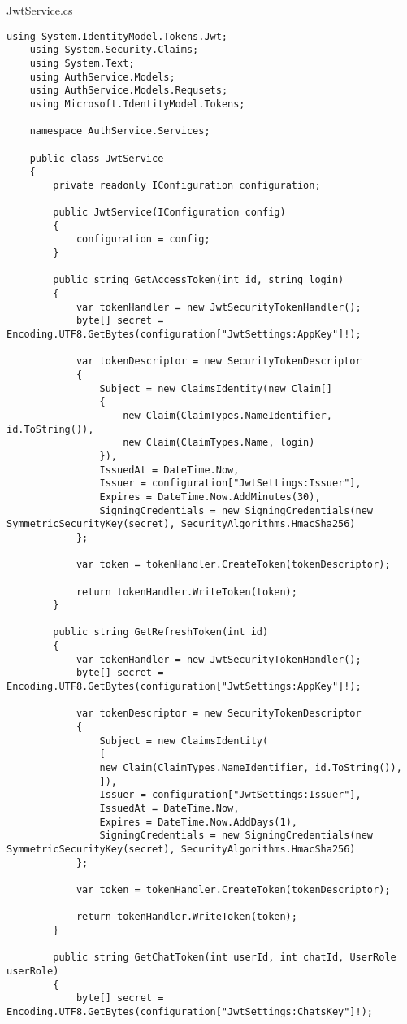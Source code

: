 JwtService.cs
\begin{lstlisting}[style=c#]
	using System.IdentityModel.Tokens.Jwt;
	using System.Security.Claims;
	using System.Text;
	using AuthService.Models;
	using AuthService.Models.Requsets;
	using Microsoft.IdentityModel.Tokens;
	
	namespace AuthService.Services;
	
	public class JwtService
	{
		private readonly IConfiguration configuration;
		
		public JwtService(IConfiguration config)
		{
			configuration = config;
		}
		
		public string GetAccessToken(int id, string login)
		{
			var tokenHandler = new JwtSecurityTokenHandler();
			byte[] secret = Encoding.UTF8.GetBytes(configuration["JwtSettings:AppKey"]!);
			
			var tokenDescriptor = new SecurityTokenDescriptor
			{
				Subject = new ClaimsIdentity(new Claim[]
				{
					new Claim(ClaimTypes.NameIdentifier, id.ToString()),
					new Claim(ClaimTypes.Name, login)
				}),
				IssuedAt = DateTime.Now,
				Issuer = configuration["JwtSettings:Issuer"],
				Expires = DateTime.Now.AddMinutes(30),
				SigningCredentials = new SigningCredentials(new SymmetricSecurityKey(secret), SecurityAlgorithms.HmacSha256)
			};
			
			var token = tokenHandler.CreateToken(tokenDescriptor);
			
			return tokenHandler.WriteToken(token);
		}
		
		public string GetRefreshToken(int id)
		{
			var tokenHandler = new JwtSecurityTokenHandler();
			byte[] secret = Encoding.UTF8.GetBytes(configuration["JwtSettings:AppKey"]!);
			
			var tokenDescriptor = new SecurityTokenDescriptor
			{
				Subject = new ClaimsIdentity(
				[
				new Claim(ClaimTypes.NameIdentifier, id.ToString()),
				]),
				Issuer = configuration["JwtSettings:Issuer"],
				IssuedAt = DateTime.Now,
				Expires = DateTime.Now.AddDays(1),
				SigningCredentials = new SigningCredentials(new SymmetricSecurityKey(secret), SecurityAlgorithms.HmacSha256)
			};
			
			var token = tokenHandler.CreateToken(tokenDescriptor);
			
			return tokenHandler.WriteToken(token);
		}
		
		public string GetChatToken(int userId, int chatId, UserRole userRole)
		{
			byte[] secret = Encoding.UTF8.GetBytes(configuration["JwtSettings:ChatsKey"]!);
			

\end{lstlisting}
